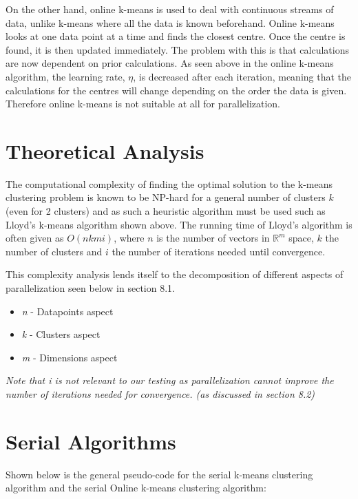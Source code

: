 \documentclass{article}
\begin{document}
On the other hand, online k-means is used to deal with continuous streams of data, unlike k-means where all the data is known beforehand. Online k-means looks at one data point at a time and finds the closest centre. Once the centre is found, it is then updated immediately. The problem with this is that calculations are now dependent on prior calculations. As seen above in the online k-means algorithm, the learning rate, $\eta$, is decreased after each iteration, meaning that the calculations for the centres will change depending on the order the data is given. Therefore online k-means is not suitable at all for parallelization.


\section{Theoretical Analysis}
The computational complexity of finding the optimal solution to the k-means clustering problem is known to be NP-hard for a general number of clusters $k$ (even for 2 clusters) and as such a heuristic algorithm must be used such as Lloyd's k-means algorithm shown above. The running time of Lloyd's algorithm is often given as $O(nkmi)$, where $n$ is the number of vectors in $\mathbb{R}^m$ space, $k$ the number of clusters and $i$ the number of iterations needed until convergence.

This complexity analysis lends itself to the decomposition of different aspects of parallelization seen below in section 8.1.
\begin{itemize}
	\item \emph{n} - Datapoints aspect
	\item \emph{k} - Clusters aspect
	\item \emph{m} - Dimensions aspect
\end{itemize}


\emph{Note that i is not relevant to our testing as parallelization cannot improve the number of iterations needed for convergence. (as discussed in section 8.2)}


\newpage


\section{Serial Algorithms}
Shown below is the general pseudo-code for the serial k-means clustering algorithm and the serial Online k-means clustering algorithm:
\end{document}

